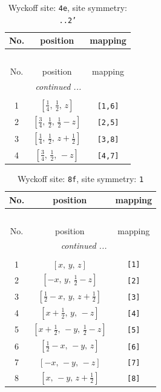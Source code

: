 \documentclass[fleqn,8pt]{jsarticle}
\begin{document}
\renewcommand{\arraystretch}{1.2}
\begin{longtable}{ccc}
\caption{Wyckoff site: {\tt 4e}, site symmetry: {\tt ..2'}}
 \\
 \hline \hline
No. & position & mapping \\ \hline \endfirsthead

\multicolumn{2}{l}{\tablename\ \thetable{}} \\
 \hline \hline
No. & position & mapping \\ \hline \endhead

 \hline \hline
\multicolumn{2}{r}{\footnotesize\it continued ...} \\ \endfoot

 \hline \hline
\multicolumn{2}{r}{} \\ \endlastfoot

1 & $\left[ \frac{1}{4},\, \frac{1}{2},\, z \right]$ & {\tt [1,6]} \\ \hline
2 & $\left[ \frac{3}{4},\, \frac{1}{2},\, \frac{1}{2} - z \right]$ & {\tt [2,5]} \\ \hline
3 & $\left[ \frac{1}{4},\, \frac{1}{2},\, z + \frac{1}{2} \right]$ & {\tt [3,8]} \\ \hline
4 & $\left[ \frac{3}{4},\, \frac{1}{2},\, - z \right]$ & {\tt [4,7]} \\
\end{longtable}
\renewcommand{\arraystretch}{1.2}
\begin{longtable}{ccc}
\caption{Wyckoff site: {\tt 8f}, site symmetry: {\tt 1}}
 \\
 \hline \hline
No. & position & mapping \\ \hline \endfirsthead

\multicolumn{2}{l}{\tablename\ \thetable{}} \\
 \hline \hline
No. & position & mapping \\ \hline \endhead

 \hline \hline
\multicolumn{2}{r}{\footnotesize\it continued ...} \\ \endfoot

 \hline \hline
\multicolumn{2}{r}{} \\ \endlastfoot

1 & $\left[ x,\, y,\, z \right]$ & {\tt [1]} \\ \hline
2 & $\left[ - x,\, y,\, \frac{1}{2} - z \right]$ & {\tt [2]} \\ \hline
3 & $\left[ \frac{1}{2} - x,\, y,\, z + \frac{1}{2} \right]$ & {\tt [3]} \\ \hline
4 & $\left[ x + \frac{1}{2},\, y,\, - z \right]$ & {\tt [4]} \\ \hline
5 & $\left[ x + \frac{1}{2},\, - y,\, \frac{1}{2} - z \right]$ & {\tt [5]} \\ \hline
6 & $\left[ \frac{1}{2} - x,\, - y,\, z \right]$ & {\tt [6]} \\ \hline
7 & $\left[ - x,\, - y,\, - z \right]$ & {\tt [7]} \\ \hline
8 & $\left[ x,\, - y,\, z + \frac{1}{2} \right]$ & {\tt [8]} \\
\end{longtable}
\end{document}
